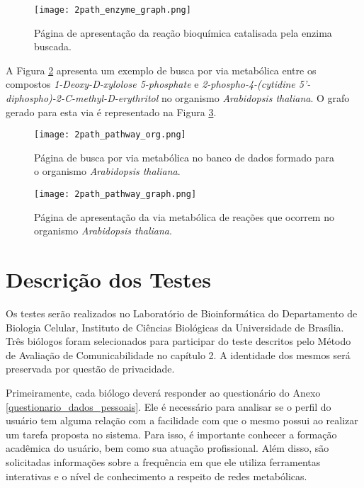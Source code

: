 \begin{figure}[!h]
    \centering
    \texttt{[image: 2path\_enzyme\_graph.png]}
    \caption{Página de apresentação da reação bioquímica catalisada pela enzima buscada.}
    \label{fig:2path_enzyme_graph}
\end{figure}

\indent A Figura \ref{fig:2path_pathway_org} apresenta um exemplo de busca por via metabólica entre os compostos \textit{1-Deoxy-D-xylolose 5-phosphate} e \textit{2-phospho-4-(cytidine 5'-diphospho)-2-C-methyl-D-erythritol} no organismo \textit{Arabidopsis thaliana}. O grafo gerado para esta via é representado na Figura \ref{fig:2path_pathway_graph}.

\begin{figure}[!h]
    \centering
    \texttt{[image: 2path\_pathway\_org.png]}
    \caption{Página de busca por via metabólica no banco de dados formado para o organismo \textit{Arabidopsis thaliana}.}
    \label{fig:2path_pathway_org}
\end{figure}

\begin{figure}[!h]
    \centering
    \texttt{[image: 2path\_pathway\_graph.png]}
    \caption{Página de apresentação da via metabólica de reações que ocorrem no organismo \textit{Arabidopsis thaliana}.}
    \label{fig:2path_pathway_graph}
\end{figure}

\section{Descrição dos Testes}

\indent Os testes serão realizados no Laboratório de Bioinformática do Departamento de Biologia Celular, Instituto de Ciências Biológicas da Universidade de Brasília. Três biólogos foram selecionados para participar do teste descritos pelo Método de Avaliação de Comunicabilidade no capítulo 2. A identidade dos mesmos será preservada por questão de privacidade.

\indent Primeiramente, cada biólogo deverá responder ao questionário do Anexo \ref{questionario_dados_pessoais}. Ele é necessário para analisar se o perfil do usuário tem alguma relação com a facilidade com que o mesmo possui ao realizar um tarefa proposta no sistema. Para isso, é importante conhecer a formação acadêmica do usuário, bem como sua atuação profissional. Além disso, são solicitadas informações sobre a frequência em que ele utiliza ferramentas interativas e o nível de conhecimento a respeito de redes metabólicas. 

